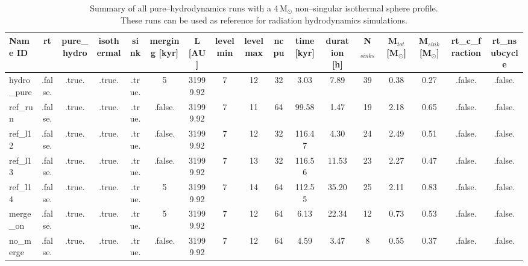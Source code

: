 \begin{table}
\begin{adjustbox}{width=1.8\textheight}
\begin{tabular}{lcccccccccccccccc}
\toprule
Name ID & rt & pure\_hydro & isothermal & sink & merging [kyr] & L [AU] & levelmin & levelmax & ncpu & time [kyr] & duration [h] & N$_{sinks}$ & M$_{tot}$ [M$_{\odot}$] & M$_{sink}$ [M$_{\odot}$] & rt\_c\_fraction & rt\_nsubcycle \\
\midrule
hydro\_pure & .false. & .true. & .true. & .true. & 5 & 31999.92 & 7 & 12 & 32 & 3.03 & 7.89 & 39 & 0.38 & 0.27 & .false. & .false. \\
ref\_run & .false. & .true. & .true. & .true. & .false. & 31999.92 & 7 & 11 & 64 & 99.58 & 1.47 & 19 & 2.18 & 0.65 & .false. & .false. \\
ref\_l12 & .false. & .true. & .true. & .true. & .false. & 31999.92 & 7 & 12 & 32 & 116.47 & 4.30 & 24 & 2.49 & 0.51 & .false. & .false. \\
ref\_l13 & .false. & .true. & .true. & .true. & .false. & 31999.92 & 7 & 13 & 32 & 116.56 & 11.53 & 23 & 2.27 & 0.47 & .false. & .false. \\
ref\_l14 & .false. & .true. & .true. & .true. & 5 & 31999.92 & 7 & 14 & 64 & 112.55 & 35.20 & 25 & 2.11 & 0.83 & .false. & .false. \\
merge\_on & .false. & .true. & .true. & .true. & 5 & 31999.92 & 7 & 12 & 64 & 6.13 & 22.34 & 12 & 0.73 & 0.53 & .false. & .false. \\
no\_merge & .false. & .true. & .true. & .true. & .false. & 31999.92 & 7 & 12 & 64 & 4.59 & 3.47 & 8 & 0.55 & 0.37 & .false. & .false. \\
\bottomrule
\end{tabular}
\end{adjustbox}
\caption[Large--sphere runs]{Summary of all pure--hydrodynamics runs with a 4\,M$_{\odot}$ non--singular isothermal sphere profile. \\
														 These runs can be used as reference for radiation hydrodynamics simulations.}
\label{tab:hydro_pure}
\end{table}
